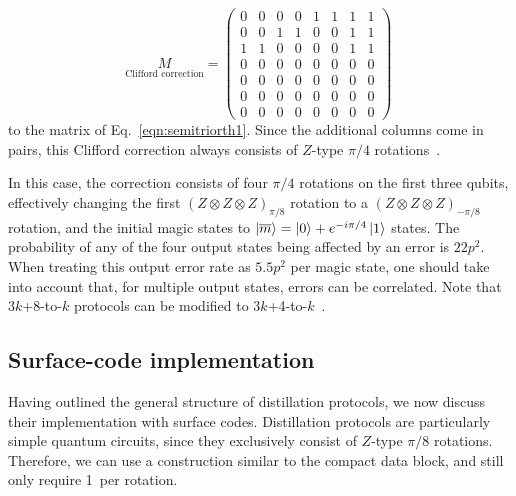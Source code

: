 \documentclass[prx,aps,letterpaper,twocolumn,allowfontchageintitle=true,accepted=2019-02-01]{quantumarticle}
\begin{document}
\begin{equation}
\underset{\text{Clifford correction}}{M} = 
\begin{pmatrix}
 0 & 0 & 0 & 0 & 1 & 1 & 1 & 1  \\
 0 & 0 & 1 & 1 & 0 & 0 & 1 & 1  \\
 1 & 1 & 0 & 0 & 0 & 0 & 1 & 1  \\
 0 & 0 & 0 & 0 & 0 & 0 & 0 & 0  \\
 0 & 0 & 0 & 0 & 0 & 0 & 0 & 0  \\
 0 & 0 & 0 & 0 & 0 & 0 & 0 & 0 \\
 0 & 0 & 0 & 0 & 0 & 0 & 0 & 0  
\end{pmatrix} \,
\label{eqn:semitriorth2}
\end{equation}
 to the matrix of Eq.~\eqref{eqn:semitriorth1}. Since the additional columns come in pairs, this Clifford correction always consists of $Z$-type $\pi/4$ rotations~\cite{Bravyi2012}.

In this case, the correction consists of four $\pi/4$ rotations on the first three qubits, effectively changing the first $(Z\otimes Z \otimes Z)_{\pi/8}$ rotation to a $(Z\otimes Z \otimes Z)_{-\pi/8}$ rotation, and the initial magic states to  $\ket{\overline{m}} = \ket{0} + e^{-i\pi/4}\ket{1}$ states. The probability of any of the four output states being affected by an error is $22p^2$. When treating this output error rate as $5.5p^2$ per magic state, one should take into account that, for multiple output states, errors can be correlated. Note that $3k$+8-to-$k$ protocols can be modified to $3k$+4-to-$k$~\cite{Meier2013,Campbell2016a,Campbell2018}. 





\subsection{Surface-code implementation}
Having outlined the general structure of distillation protocols, we now discuss their implementation with surface codes. Distillation protocols are particularly simple quantum circuits, since they exclusively consist of $Z$-type $\pi/8$ rotations. Therefore, we can use a construction similar to the compact data block, and still only require 1\clock \ per rotation. 
\end{document}
